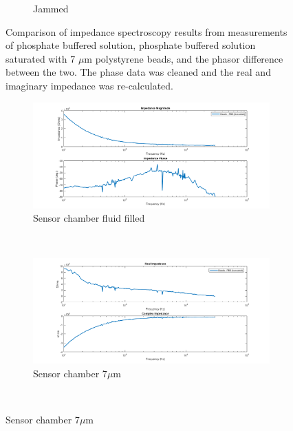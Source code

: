 \begin{figure}[h]
\begin{subfigure}[b]{\textwidth}
        \caption{Jammed}
    \end{subfigure}
    \caption[PBS, PBS saturated with micro-beads, and the phasor difference.]{Comparison of impedance spectroscopy results from measurements of phosphate buffered solution, phosphate buffered solution saturated with 7 $\mu$m polystyrene beads, and the phasor difference between the two. The phase data was cleaned and the real and imaginary impedance was re-calculated.}
    \label{fig:IS_data_pbs_pbsBeads_difference}
\end{figure}

\begin{figure}[h]
    \centering
    \begin{subfigure}[b]{\textwidth}
        \centering
        \includegraphics[width=\textwidth]{images/IS_data_beads-PBS_truncated_mag_phase.png}
        \caption{Sensor chamber fluid filled}
    \end{subfigure}
    \\
    \vspace{0.1 in}
    \begin{subfigure}[b]{\textwidth}
        \centering
        \includegraphics[width=\textwidth]{images/IS_data_beads-PBS_truncated_real_imag.png}
        \caption{Sensor chamber 7$\mu$m }
    \end{subfigure}
    \\
    \vspace{0.1 in}

\end{figure}
